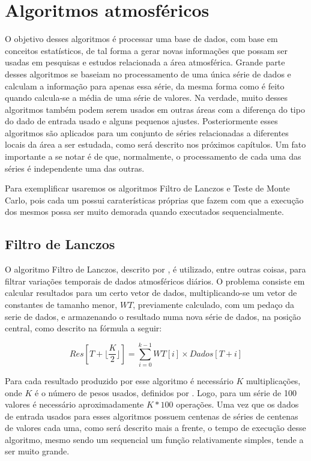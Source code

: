 \chapter{Algoritmos atmosféricos}

O objetivo desses algoritmos é processar uma base de dados, com base em conceitos estatísticos, de tal forma a gerar novas informações que possam ser usadas em pesquisas e estudos relacionada a área atmosférica. Grande parte desses algoritmos se baseiam no processamento de uma única série de dados e calculam a informação para apenas essa série, da mesma forma como é feito quando calcula-se a média de uma série de valores. Na verdade, muito desses algoritmos também podem serem usados em outras áreas com a diferença do tipo do dado de entrada usado e alguns pequenos ajustes. Posteriormente esses algoritmos são aplicados para um conjunto de séries relacionadas a diferentes locais da área a ser estudada, como será descrito nos próximos capítulos. Um fato importante a se notar é de que, normalmente, o processamento de cada uma das séries é independente uma das outras. 

Para exemplificar usaremos os algoritmos Filtro de Lanczos e Teste de Monte Carlo, pois cada um possui caraterísticas próprias que fazem com que a execução dos mesmos possa ser muito demorada quando executados sequencialmente.

\section{Filtro de Lanczos}

O algoritmo Filtro de Lanczos, descrito por \cite{Duchon:1979}, é utilizado, entre outras coisas, para filtrar variações temporais de dados atmosféricos diários. O problema consiste em calcular resultados para um certo vetor de dados, multiplicando-se um vetor de constantes de tamanho menor, $WT$, previamente calculado, com um pedaço da serie de dados, e armazenando o resultado numa nova série de dados, na posição central, como descrito na fórmula a seguir:

\[ Res[T+ \lfloor \frac{K}{2} \rfloor ]=\sum _{i=0} ^{k-1} WT[i] \times Dados[T+i] \]

Para cada resultado produzido por esse algoritmo é necessário $K$ multiplicações, onde $K$ é o número de pesos usados, definidos por \cite{Duchon:1979}. Logo, para um série de 100 valores é necessário aproximadamente $K*100$ operações. Uma vez que os dados de entrada usados para esses algoritmos possuem centenas de séries de centenas de valores cada uma, como será descrito mais a frente, o tempo de execução desse algoritmo, mesmo sendo um sequencial um função relativamente simples, tende a ser muito grande.

